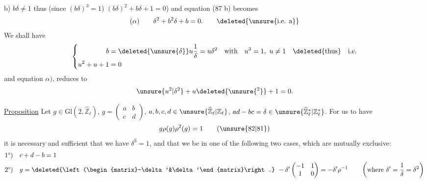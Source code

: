 b) $b\delta\ne1$ thus (since $(b\delta)^3=1$) $(b\delta)^2+b\delta+1=0$)
and equation (87 b) becomes
\[
(\alpha)\qquad\delta^2+b^2\delta+b=0.\qquad\deleted{\text{\unsure{i.e. a}}}
\]
We shall have
\[
\left\{\begin{aligned}
b&=\deleted{\unsure{\delta}}u\frac1\delta=u\delta^2\quad\text{with}\quad u^3=1,\ u\ne1\quad\deleted{\text{thus}}\quad\text{i.e.}\\
u^2+u+1&=0
\end{aligned}\right.
\]
and equation $\alpha)$,  reduces to
\[
\unsure{u^2|\delta^2}+u\deleted{\unsure{{}^{2}}}+1=0.
\]



\uline{Proposition} Let $g\in\mathrm{Gl}(2,\widehat{\mathbb Z}_\ell)$, $g=\begin{pmatrix}a&b\\c&d\end{pmatrix}$, $a,b,c,d\in\unsure{\widehat{\mathbb Z}_\ell|\mathbb Z_\ell}$,
$ad-bc=\delta\in\unsure{\widehat{\mathbb Z}_\ell^{*}|\mathbb Z_\ell^{*}}$. For us to have
\[
g\rho(g)\rho^2(g)=1\qquad(\unsure{82|81})
\]
it is necessary and sufficient that we have $\delta^3=1$, and that we be in one of the following two cases, which are mutually exclusive:
\[
\begin{aligned}
1\text{°)}\quad&c+d-b=1\\
2\text{°)}\quad&g=\deleted{\left(\begin{matrix}-\delta'&\delta'\end{matrix}\right.}\ -\delta'\begin{pmatrix}-1&1\\1&0\end{pmatrix}=-\delta'\rho^{-1}\qquad\left(\text{where }\delta'=\frac1\delta=\delta^2\right)
\end{aligned}
\]

